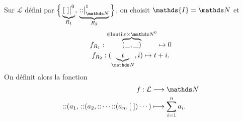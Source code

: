 \begin{exm}
	Sur $\mathcal{L}$\/ défini par $\Big\{\underbrace{[~]\big|^0}_{R_1},\,\underbrace{{::}\big|_{\N}^1}_{R_2}\Big\}$, on choisit $\mathds{I} = \N$\/ et
	\begin{gather*}
		f_{R_1} : \overbrace{(\_,\_)}^{\in \text{Inutile} \times  \N^0} \mapsto 0\\
		f_{R_2} : (\underbrace{t}_{\N}, i) \mapsto t + i.
	\end{gather*}
	On définit alors la fonction \begin{align*}
		f: \mathcal{L} &\longrightarrow \N \\
		{::}(a_1,\,{::}(a_2, {::}\cdots{::}(a_n, [~])\cdots)&\longmapsto \sum_{i=1}^n a_i.
	\end{align*}
\end{exm}


